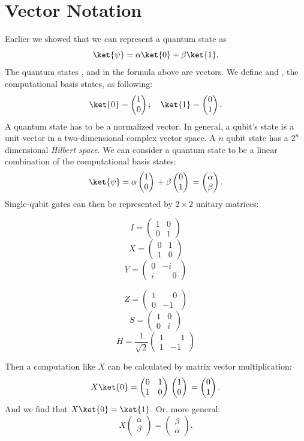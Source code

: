 \documentclass[11pt, notitlepage]{report}
\newcommand{\igate}{
  \begin{pmatrix}
  1 & 0 \\
  0 & 1
  \end{pmatrix}
}
\newcommand{\xgate}{
  \begin{pmatrix}
  0 & 1 \\
  1 & 0
  \end{pmatrix}
}
\newcommand{\ygate}{
  \begin{pmatrix}
  0 & -i \\
  i & \phantom{-}0
  \end{pmatrix}
}
\newcommand{\zgate}{
  \begin{pmatrix}
  1 & \phantom{-}0 \\
  0 & -1
  \end{pmatrix}
}
\newcommand{\hgate}{
  \dfrac{1}{\sqrt2}
  \begin{pmatrix}
  1 & \phantom{-}1 \\
  1 & -1
  \end{pmatrix}
}
\renewcommand{\sgate}{
  \begin{pmatrix}
  1 & 0 \\
  0 & i
  \end{pmatrix}
}
\newcommand{\qstatezero}{
  \begin{pmatrix}1 \\ 0\end{pmatrix}
}
\newcommand{\qstateone}{
  \begin{pmatrix}0 \\ 1\end{pmatrix}
}
\begin{document}
\section{Vector Notation} \label{sec:matrix_notation}
Earlier we showed that we can represent a quantum state as
\begin{equation}
  \ket{\psi} = \alpha\ket{0} + \beta\ket{1}.
\end{equation}
The quantum states \ket{\psi},  and  in the formula above are vectors. We define  and , the computational basis states, as following:
\setlength\multicolsep{0pt}
\begin{equation}
\ket{0} = \qstatezero{}; \quad \ket{1} = \qstateone{}.
\end{equation}
\noindent
A quantum state has to be a normalized vector. In general, a qubit's state is a unit vector in a two-dimensional complex vector space. A $n$ qubit state has a $2^n$ dimensional \emph{Hilbert space}. We can consider a quantum state to be a linear combination of the computational basis states:
\begin{equation}
  \ket{\psi} = \alpha\qstatezero{} + \beta\qstateone{} = \begin{pmatrix}\alpha \\ \beta\end{pmatrix}.
\end{equation}
Single-qubit gates can then be represented by $2 \times 2$ unitary matrices:
\vspace*{-4mm}
\setlength\multicolsep{0pt}
\begin{multicols}{3}
  \[
    I = \igate{}
  \]
  \vfill
  \[
    X = \xgate{}
  \]
  \vfill
  \[
    Y = \ygate{}
  \]
\end{multicols}
\begin{multicols}{3}
  \[
    Z = \zgate{}
  \]
  \vfill
  \[
    S = \sgate{}
  \]
  \vfill
  \[
    H = \hgate{}
  \]
\end{multicols}
\bigskip
\noindent
Then a computation like $X$ can be calculated by matrix vector multiplication:
\begin{equation}
X\ket{0} = \xgate{} \qstatezero{} = \qstateone{}.
\end{equation}
And we find that $X\ket{0} = \ket{1}$. Or, more general:
\begin{equation}
  X\begin{pmatrix}\alpha \\ \beta\end{pmatrix} = \begin{pmatrix}\beta \\ \alpha\end{pmatrix}.
\end{equation}
\end{document}
